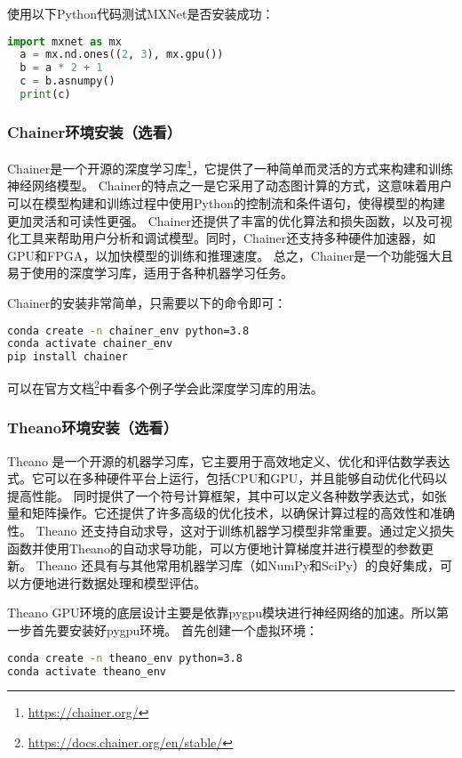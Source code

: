 \documentclass[lang=cn,a4paper,newtx]{elegantpaper}
\begin{document}
使用以下Python代码测试MXNet是否安装成功：
\begin{lstlisting}[language=python]
  import mxnet as mx
  a = mx.nd.ones((2, 3), mx.gpu())
  b = a * 2 + 1
  c = b.asnumpy()
  print(c)
\end{lstlisting}

\subsubsection{Chainer环境安装（选看）}
Chainer是一个开源的深度学习库\footnote{\url{https://chainer.org/}}，它提供了一种简单而灵活的方式来构建和训练神经网络模型。
Chainer的特点之一是它采用了动态图计算的方式，这意味着用户可以在模型构建和训练过程中使用Python的控制流和条件语句，使得模型的构建更加灵活和可读性更强。
Chainer还提供了丰富的优化算法和损失函数，以及可视化工具来帮助用户分析和调试模型。同时，Chainer还支持多种硬件加速器，如GPU和FPGA，以加快模型的训练和推理速度。
总之，Chainer是一个功能强大且易于使用的深度学习库，适用于各种机器学习任务。

Chainer的安装非常简单，只需要以下的命令即可：
\begin{lstlisting}[language=bash]
conda create -n chainer_env python=3.8
conda activate chainer_env
pip install chainer
\end{lstlisting}

可以在官方文档\footnote{\url{https://docs.chainer.org/en/stable/}}中看多个例子学会此深度学习库的用法。

\subsubsection{Theano环境安装（选看）}
Theano 是一个开源的机器学习库，它主要用于高效地定义、优化和评估数学表达式。它可以在多种硬件平台上运行，包括CPU和GPU，并且能够自动优化代码以提高性能。
同时提供了一个符号计算框架，其中可以定义各种数学表达式，如张量和矩阵操作。它还提供了许多高级的优化技术，以确保计算过程的高效性和准确性。
Theano 还支持自动求导，这对于训练机器学习模型非常重要。通过定义损失函数并使用Theano的自动求导功能，可以方便地计算梯度并进行模型的参数更新。
Theano 还具有与其他常用机器学习库（如NumPy和SciPy）的良好集成，可以方便地进行数据处理和模型评估。

Theano GPU环境的底层设计主要是依靠pygpu模块进行神经网络的加速。所以第一步首先要安装好pygpu环境。
首先创建一个虚拟环境：
\begin{lstlisting}[language=bash]
conda create -n theano_env python=3.8
conda activate theano_env
\end{lstlisting}
\end{document}
